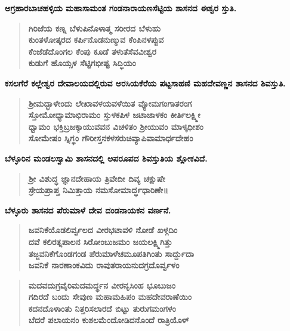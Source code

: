 \noindent
\textbf{ಅಗ್ರಹಾರಬಾಚಹಳ್ಳಿಯ ಮಹಾಸಾಮಂತ ಗಂಡನಾರಾಯಣಸೆಟ್ಟಿಯ ಶಾಸನದ ಈಶ್ವರ ಸ್ತುತಿ.}

\begin{verse}
\textbf{ಗಿರಿಜೆಯ ಕಣ್ನ ಬೆಳುಪಿನೊಳಾತ್ಮ ಸರೀರದ ಬೆಳುಹು \\ ಕುಂತಳೋತ್ಕರದ ಕರ್ಪಿನೊಡನುಣ್ಮುವ ಕೆಂಪಿನಳಪ್ಪುವ \\ ಕೆಂಜೆಡೆದೊಂಗಲ ಕೆಂಪು ಕೂಡೆ ತಳುತೆಸೆವವೀಶ್ವರ \\ ಕುಡುಗೆ ಹೊಯ್ಸಳ ಸೆಟ್ಟಿಗಭೀಷ್ಟ ಸಿದ್ಧಿಯಂ}
\end{verse}

\noindent
\textbf{ಕಸಲಗೆರೆ ಕಲ್ಲೇಶ್ವರ ದೇವಾಲಯದಲ್ಲಿರುವ ಅರಸಿಯಕೆರೆಯ ಪಟ್ಟಸಾಹಣಿ ಮಹದೇವಣ್ಣನ ಶಾಸನದ ಶಿವಸ್ತುತಿ.}

\begin{verse}
\textbf{ಶ‍್ರೀಮದ್ಭಾಳೇಂದು ಲೇಖಾವಳಯವಳೆಯಿತ ವ್ಯೋಮಗಂಗಾತರಂಗ \\ ಸ್ತೋಮೋಧ್ಯಾಮಾಭಿರಾಮಂ ಸ್ತುಳಕಪಿಳ ಜಟಾಜಾಳಕಂ ಕೀರ್ತಿಲಕ್ಷ್ಮೀ \\ ಧ್ವಾಮಂ ಭಕ್ತಿಬ್ರಜಕ್ಕಾಯುವವನ ವಿಚಳಿತಂ ಶ‍್ರೀಯುವಂ ಮಾಳ್ಕಧೀಶಂ\\ ಸೋಮೇಷಂ ಸ್ನಿಗ್ಧಂ ಗೌರೀಸ್ತನಕಳಸರುಚಿವ್ಯಾಪಿವಾಮಾರ್ಧದೇಹಂ}
\end{verse}

\noindent
\textbf{ಬೆಳ್ಳೂರಿನ ಮಂಡಲಸ್ವಾಮಿ ಶಾಸನದಲ್ಲಿ ಅಪರೂಪದ ಶಿವಸ್ತುತಿಯ ಶ್ಲೋಕವಿದೆ.}

\begin{verse}
\textbf{ಶ‍್ರೀ ವಿಶುದ್ಧ ಜ್ಞಾನದೇಹಾಯ ತ್ರಿವೇದೀ ದಿವ್ಯ ಚಕ್ಷುಷೇ\\ ಸ್ರೇಯಪ್ರಾಪ್ತ ನಿಮಿತ್ತಾಯ ನಮಸೋಮಾರ್ದ್ಧಧಾರಿಣೇ॥}
\end{verse}

\newpage

\noindent
\textbf{ಬೆಳ್ಳೂರು ಶಾಸನದ ಪೆರುಮಾಳೆ ದೇವ ದಂಡನಾಯಕನ ವರ್ಣನೆ.}

\begin{verse}
\textbf{ಜವನಿಕೆಯೊಡಲಿರ್ವ್ವಲದ ವೀರಭಟಾವಳಿ ನೋಡೆ ಖಳ್ಗದಿಂ\\ ದವೆ ಕಲಿರತ್ನಪಾಲನ ಸಿರೋಂಬುಜಮಂ ಜಯಲಕ್ಷ್ಮಿಗಿತ್ತು \\ ತಜ್ಜವನಿಕೆಗೊಂಡಗಂಡ ಪೆರುಮಾಳೆಚಮೂಪತಿಗಿಂತು ಸಾರ್ದ್ದುದಾ \\ ಜವನಿಕೆ ನಾರಣಾಂಕವಿದು ರಾವುತರಾಯನುದಗ್ರದೊರ್ವ್ವಳಂ}
\end{verse}

\begin{verse}
\textbf{ಮದವದುಗ್ರವೈರಿಮದಮರ್ದ್ಧನ ವೀರನೃಸಿಂಹ ಭೂಬುಜಂ \\ ಗದಿರದೆ ಬಂದು ಸೇವುಣ ಮಹಾಮಹಿಪಂ ಮಹದೇವರಾಣೆಯಿಂ \\ ಕದನದೊಳಾಂತು ನಿತ್ತರಿಸಲಾರದೆ ಬಿಟ್ಟು ತುರುಗಮಂಗಳಂ \\ ಬೆದರೆ ಪಲಾಯನಂ ಕುಶಲಮೆಂದೋಡಿದನೊಂದೆ ರಾತ್ರಿಯೊಳ್​}
\end{verse}

